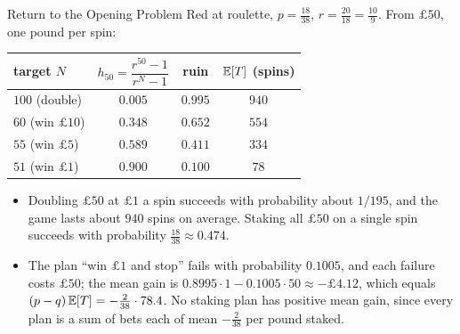 \begin{frame}{Return to the Opening Problem}
  \label{fr:ruinreturn}
  \small
  Red at roulette, $p=\tfrac{18}{38}$, $r=\tfrac{20}{18}=\tfrac{10}9$. From $\pounds50$, one pound per spin:
  \begin{center}
    \renewcommand{\arraystretch}{1.25}
    \begin{tabular}{@{}lccc@{}}
      \toprule
      target $N$ & $h_{50}=\dfrac{r^{50}-1}{r^{N}-1}$ & ruin & $\mathbb{E}[T]$ (spins) \\
      \midrule
      $100$ (double) & $0.005$ & $0.995$ & $940$ \\
      $60$ (win $\pounds10$) & $0.348$ & $0.652$ & $554$ \\
      $55$ (win $\pounds5$) & $0.589$ & $0.411$ & $334$ \\
      $51$ (win $\pounds1$) & $0.900$ & $0.100$ & $78$ \\
      \bottomrule
    \end{tabular}
  \end{center}
  \begin{itemize}
    \item Doubling $\pounds50$ at $\pounds1$ a spin succeeds with probability about $1/195$, and the game lasts about $940$ spins on average. Staking all $\pounds50$ on a single spin succeeds with probability $\tfrac{18}{38}\approx0.474$.
    \item The plan ``win $\pounds1$ and stop'' fails with probability $0.1005$, and each failure costs $\pounds50$; the mean gain is $0.8995\cdot1-0.1005\cdot50\approx-\pounds4.12$, which equals $(p-q)\,\mathbb{E}[T]=-\tfrac2{38}\cdot78.4$. No staking plan has positive mean gain, since every plan is a sum of bets each of mean $-\tfrac2{38}$ per pound staked.
  \end{itemize}
\end{frame}


